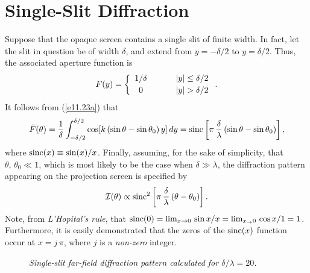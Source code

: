 \section{Single-Slit Diffraction}\label{s11.6}
Suppose that the opaque screen contains a single slit of finite width. In fact, let the slit in question be of width $\delta$,
and extend from $y=-\delta/2$ to $y=\delta/2$. Thus, the associated aperture function is
\begin{equation}\label{e11.45}
F(y)=\left\{
\begin{array}{ccc}
1/\delta&\mbox{\hspace{0.5cm}}&|y|\leq \delta/2\\[0.5ex]
0 &&|y|> \delta/2
\end{array}\right..
\end{equation}
It follows from (\ref{e11.23a}) that
\begin{equation}\label{e11.46}
\bar{F}(\theta) =\frac{1}{\delta} \int_{-\delta/2}^{\delta/2} \cos[k\,(\sin\theta-\sin\theta_0)\,y]\,dy = {\rm sinc}\left[\pi\,\frac{\delta}{\lambda}\,(\sin\theta-\sin\theta_0)\right],
\end{equation}
where ${\rm sinc}(x)\equiv \sin(x)/x$. Finally, assuming, for the sake of simplicity, that $\theta,\,\theta_0\ll 1$, 
which is most likely to be the case when $\delta\gg \lambda$, the diffraction
pattern appearing on the projection screen  is specified by
\begin{equation}\label{e11.47}
{\cal I}(\theta) \propto {\rm sinc}^2\left[\pi\,\frac{\delta}{\lambda}\,(\theta-\theta_0)\right].
\end{equation}
Note,  from {\em L'Hopital's rule}, that ${\rm sinc}(0)=\lim_{x\rightarrow 0}\,\sin x/x = \lim_{x_\rightarrow 0}\, \cos x/1=1$.
Furthermore, it is easily demonstrated that the zeros of the ${\rm sinc}(x)$ function occur at $x=j\,\pi$, where $j$ is a {\em non-zero}\/ integer.

\begin{figure}
\epsfysize=2.5in
\centerline{}
\caption{\em Single-slit  far-field diffraction pattern calculated for  $\delta/\lambda = 20$.}\label{f11.9}   
\end{figure}

